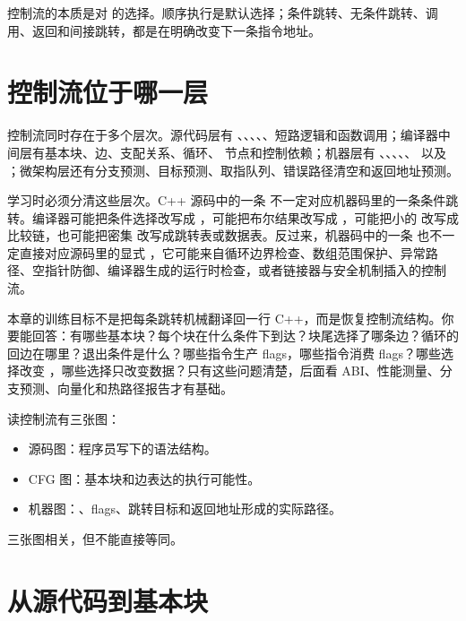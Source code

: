 \begin{keyidea}
控制流的本质是对  的选择。顺序执行是默认选择；条件跳转、无条件跳转、调用、返回和间接跳转，都是在明确改变下一条指令地址。
\end{keyidea}

\section{控制流位于哪一层}

控制流同时存在于多个层次。源代码层有 、、、、、短路逻辑和函数调用；编译器中间层有基本块、边、支配关系、循环、 节点和控制依赖；机器层有 、、、、、 以及 ；微架构层还有分支预测、目标预测、取指队列、错误路径清空和返回地址预测。

学习时必须分清这些层次。C++ 源码中的一条  不一定对应机器码里的一条条件跳转。编译器可能把条件选择改写成 ，可能把布尔结果改写成 ，可能把小的  改写成比较链，也可能把密集  改写成跳转表或数据表。反过来，机器码中的一条  也不一定直接对应源码里的显式 ，它可能来自循环边界检查、数组范围保护、异常路径、空指针防御、编译器生成的运行时检查，或者链接器与安全机制插入的控制流。

本章的训练目标不是把每条跳转机械翻译回一行 C++，而是恢复控制流结构。你要能回答：有哪些基本块？每个块在什么条件下到达？块尾选择了哪条边？循环的回边在哪里？退出条件是什么？哪些指令生产 flags，哪些指令消费 flags？哪些选择改变 ，哪些选择只改变数据？只有这些问题清楚，后面看 ABI、性能测量、分支预测、向量化和热路径报告才有基础。

\begin{mentalmodel}
读控制流有三张图：

\begin{itemize}
  \item 源码图：程序员写下的语法结构。
  \item CFG 图：基本块和边表达的执行可能性。
  \item 机器图：、flags、跳转目标和返回地址形成的实际路径。
\end{itemize}

三张图相关，但不能直接等同。
\end{mentalmodel}

\section{从源代码到基本块}

